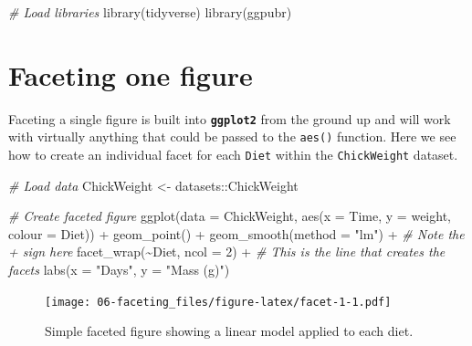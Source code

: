 \documentclass[
]{book}
\newenvironment{Shaded}{\begin{snugshade}}{\end{snugshade}}
\newcommand{\AttributeTok}[1]{\textcolor[rgb]{0.77,0.63,0.00}{#1}}
\newcommand{\CommentTok}[1]{\textcolor[rgb]{0.56,0.35,0.01}{\textit{#1}}}
\newcommand{\DecValTok}[1]{\textcolor[rgb]{0.00,0.00,0.81}{#1}}
\newcommand{\FunctionTok}[1]{\textcolor[rgb]{0.00,0.00,0.00}{#1}}
\newcommand{\NormalTok}[1]{#1}
\newcommand{\OtherTok}[1]{\textcolor[rgb]{0.56,0.35,0.01}{#1}}
\newcommand{\SpecialCharTok}[1]{\textcolor[rgb]{0.00,0.00,0.00}{#1}}
\newcommand{\StringTok}[1]{\textcolor[rgb]{0.31,0.60,0.02}{#1}}
\begin{document}
\begin{Shaded}
\begin{Highlighting}[]
\CommentTok{\# Load libraries}
\FunctionTok{library}\NormalTok{(tidyverse)}
\FunctionTok{library}\NormalTok{(ggpubr)}
\end{Highlighting}
\end{Shaded}

\hypertarget{faceting-one-figure}{%
\section{Faceting one figure}\label{faceting-one-figure}}

Faceting a single figure is built into \textbf{\texttt{ggplot2}} from the ground up and will work with virtually anything that could be passed to the \texttt{aes()} function. Here we see how to create an individual facet for each \texttt{Diet} within the \texttt{ChickWeight} dataset.

\begin{Shaded}
\begin{Highlighting}[]
\CommentTok{\# Load data}
\NormalTok{ChickWeight }\OtherTok{\textless{}{-}}\NormalTok{ datasets}\SpecialCharTok{::}\NormalTok{ChickWeight}

\CommentTok{\# Create faceted figure}
\FunctionTok{ggplot}\NormalTok{(}\AttributeTok{data =}\NormalTok{ ChickWeight, }\FunctionTok{aes}\NormalTok{(}\AttributeTok{x =}\NormalTok{ Time, }\AttributeTok{y =}\NormalTok{ weight, }\AttributeTok{colour =}\NormalTok{ Diet)) }\SpecialCharTok{+}
  \FunctionTok{geom\_point}\NormalTok{() }\SpecialCharTok{+}
  \FunctionTok{geom\_smooth}\NormalTok{(}\AttributeTok{method =} \StringTok{"lm"}\NormalTok{) }\SpecialCharTok{+} \CommentTok{\# Note the \textasciigrave{}+\textasciigrave{} sign here}
  \FunctionTok{facet\_wrap}\NormalTok{(}\SpecialCharTok{\textasciitilde{}}\NormalTok{Diet, }\AttributeTok{ncol =} \DecValTok{2}\NormalTok{) }\SpecialCharTok{+} \CommentTok{\# This is the line that creates the facets}
  \FunctionTok{labs}\NormalTok{(}\AttributeTok{x =} \StringTok{"Days"}\NormalTok{, }\AttributeTok{y =} \StringTok{"Mass (g)"}\NormalTok{)}
\end{Highlighting}
\end{Shaded}

\begin{figure}
\centering
\texttt{[image: 06-faceting\_files/figure-latex/facet-1-1.pdf]}
\caption{\label{fig:facet-1}Simple faceted figure showing a linear model applied to each diet.}
\end{figure}
\end{document}
